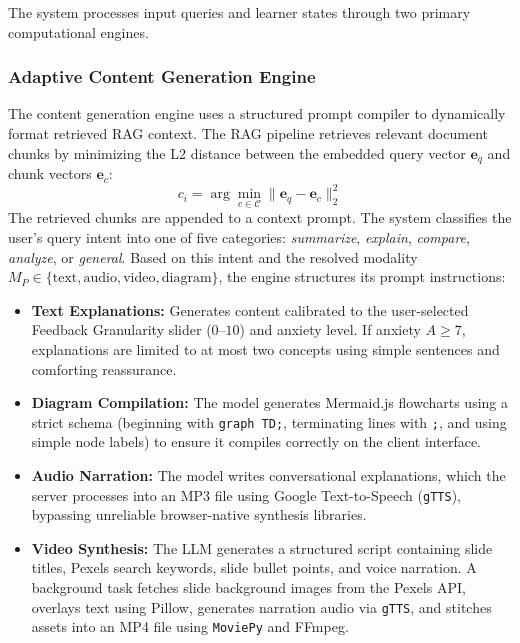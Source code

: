 \documentclass[final,5p,times,twocolumn,authoryear]{elsarticle}
\begin{document}
The system processes input queries and learner states through two primary computational engines.

\subsubsection{Adaptive Content Generation Engine}
\label{subsubsec:content_generation_engine}

The content generation engine uses a structured prompt compiler to dynamically format retrieved RAG context. The RAG pipeline retrieves relevant document chunks by minimizing the L2 distance between the embedded query vector $\mathbf{e}_q$ and chunk vectors $\mathbf{e}_c$:
\begin{equation}
    c_i = \arg\min_{c \in \mathcal{C}} \|\mathbf{e}_q - \mathbf{e}_c\|_2^2
\end{equation}
The retrieved chunks are appended to a context prompt. The system classifies the user's query intent into one of five categories: \textit{summarize}, \textit{explain}, \textit{compare}, \textit{analyze}, or \textit{general}. Based on this intent and the resolved modality $M_P \in \{\text{text}, \text{audio}, \text{video}, \text{diagram}\}$, the engine structures its prompt instructions:
\begin{itemize}
    \item \textbf{Text Explanations:} Generates content calibrated to the user-selected Feedback Granularity slider ($0$--$10$) and anxiety level. If anxiety $A \ge 7$, explanations are limited to at most two concepts using simple sentences and comforting reassurance.
    \item \textbf{Diagram Compilation:} The model generates Mermaid.js flowcharts using a strict schema (beginning with \texttt{graph TD;}, terminating lines with \texttt{;}, and using simple node labels) to ensure it compiles correctly on the client interface.
    \item \textbf{Audio Narration:} The model writes conversational explanations, which the server processes into an MP3 file using Google Text-to-Speech (\texttt{gTTS}), bypassing unreliable browser-native synthesis libraries.
    \item \textbf{Video Synthesis:} The LLM generates a structured script containing slide titles, Pexels search keywords, slide bullet points, and voice narration. A background task fetches slide background images from the Pexels API, overlays text using Pillow, generates narration audio via \texttt{gTTS}, and stitches assets into an MP4 file using \texttt{MoviePy} and FFmpeg.
\end{itemize}
\end{document}
